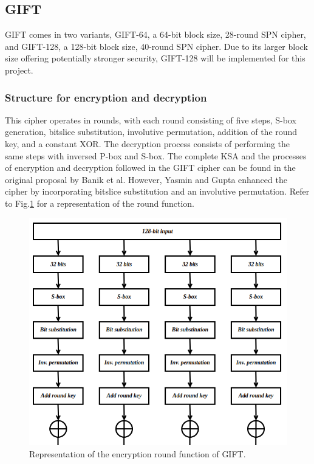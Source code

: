 \documentclass[conference]{IEEEtran}
\begin{document}
\subsection{GIFT}

GIFT comes in two variants, GIFT-64, a 64-bit block size, 28-round SPN cipher, and GIFT-128, a 128-bit block size, 40-round SPN cipher. Due to its larger block size offering potentially stronger security, GIFT-128 will be implemented for this project\cite{yasmin2023modified}.

\subsubsection{Structure for encryption and decryption}

This cipher operates in rounds, with each round consisting of five steps, S-box generation, bitslice substitution, involutive permutation, addition of the round key, and a constant XOR. The decryption process consists of performing the same steps with inversed P-box and S-box. The complete KSA and the processes of encryption and decryption followed in the GIFT cipher can be found in the original proposal by Banik et al\cite{GIFT}. However, Yasmin and Gupta enhanced the cipher by incorporating bitslice substitution and an involutive permutation\cite{yasmin2023modified}. Refer to Fig.\ref{fig:GIFT-} for a representation of the round function.

\begin{figure}
    \centering
    \includegraphics[width=0.8\columnwidth]{figures/GIFT-ROUND.png}
    \caption{Representation of the encryption round function of GIFT\cite{yasmin2023modified}.}
    \label{fig:GIFT-}
\end{figure}
\end{document}

